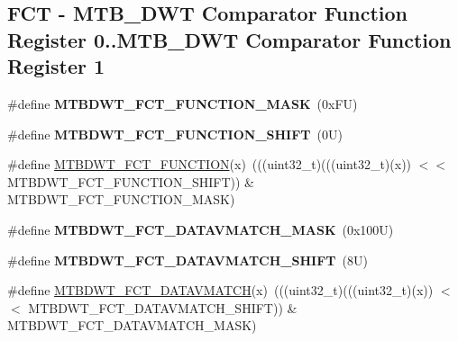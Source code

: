 \subsection*{F\+CT -\/ M\+T\+B\+\_\+\+D\+WT Comparator Function Register 0..M\+T\+B\+\_\+\+D\+WT Comparator Function Register 1}
\begin{DoxyCompactItemize}
\item 
\mbox{\label{group___m_t_b_d_w_t___register___masks_ga05376c97e9f6d9af8d411be187d45d4c}} 
\#define {\bfseries M\+T\+B\+D\+W\+T\+\_\+\+F\+C\+T\+\_\+\+F\+U\+N\+C\+T\+I\+O\+N\+\_\+\+M\+A\+SK}~(0x\+F\+U)
\item 
\mbox{\label{group___m_t_b_d_w_t___register___masks_gae855270584ab08b726fd88c288d2e605}} 
\#define {\bfseries M\+T\+B\+D\+W\+T\+\_\+\+F\+C\+T\+\_\+\+F\+U\+N\+C\+T\+I\+O\+N\+\_\+\+S\+H\+I\+FT}~(0\+U)
\item 
\#define \mbox{\hyperlink{group___m_t_b_d_w_t___register___masks_ga14d63a7f56cfa9813f635e1bf3b2d1b0}{M\+T\+B\+D\+W\+T\+\_\+\+F\+C\+T\+\_\+\+F\+U\+N\+C\+T\+I\+ON}}(x)~(((uint32\+\_\+t)(((uint32\+\_\+t)(x)) $<$$<$ M\+T\+B\+D\+W\+T\+\_\+\+F\+C\+T\+\_\+\+F\+U\+N\+C\+T\+I\+O\+N\+\_\+\+S\+H\+I\+FT)) \& M\+T\+B\+D\+W\+T\+\_\+\+F\+C\+T\+\_\+\+F\+U\+N\+C\+T\+I\+O\+N\+\_\+\+M\+A\+SK)
\item 
\mbox{\label{group___m_t_b_d_w_t___register___masks_ga470cbefd664513c09ba77981a1b21cf2}} 
\#define {\bfseries M\+T\+B\+D\+W\+T\+\_\+\+F\+C\+T\+\_\+\+D\+A\+T\+A\+V\+M\+A\+T\+C\+H\+\_\+\+M\+A\+SK}~(0x100\+U)
\item 
\mbox{\label{group___m_t_b_d_w_t___register___masks_ga97c08cb34ddc638585a0af94825ed2f5}} 
\#define {\bfseries M\+T\+B\+D\+W\+T\+\_\+\+F\+C\+T\+\_\+\+D\+A\+T\+A\+V\+M\+A\+T\+C\+H\+\_\+\+S\+H\+I\+FT}~(8\+U)
\item 
\#define \mbox{\hyperlink{group___m_t_b_d_w_t___register___masks_ga29b5461e26a1320214e56f10c37729e7}{M\+T\+B\+D\+W\+T\+\_\+\+F\+C\+T\+\_\+\+D\+A\+T\+A\+V\+M\+A\+T\+CH}}(x)~(((uint32\+\_\+t)(((uint32\+\_\+t)(x)) $<$$<$ M\+T\+B\+D\+W\+T\+\_\+\+F\+C\+T\+\_\+\+D\+A\+T\+A\+V\+M\+A\+T\+C\+H\+\_\+\+S\+H\+I\+FT)) \& M\+T\+B\+D\+W\+T\+\_\+\+F\+C\+T\+\_\+\+D\+A\+T\+A\+V\+M\+A\+T\+C\+H\+\_\+\+M\+A\+SK)
\item 

\end{DoxyCompactItemize}
